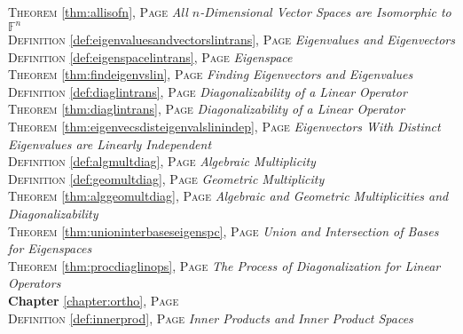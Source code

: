 \begin{multicols}{2}
{         \textsc{Theorem} \ref{thm:allisofn}, \textsc{Page} \pageref{thm:allisofn} \textit{All \(n\)-Dimensional Vector Spaces are Isomorphic to \(\mathbb {F}^n\)} \\
         \textsc{Definition} \ref{def:eigenvaluesandvectorslintrans}, \textsc{Page} \pageref{def:eigenvaluesandvectorslintrans} \textit{Eigenvalues and Eigenvectors} \\
         \textsc{Definition} \ref{def:eigenspacelintrans}, \textsc{Page} \pageref{def:eigenspacelintrans} \textit{Eigenspace} \\
         \textsc{Theorem} \ref{thm:findeigenvslin}, \textsc{Page} \pageref{thm:findeigenvslin} \textit{Finding Eigenvectors and Eigenvalues} \\
         \textsc{Definition} \ref{def:diaglintrans}, \textsc{Page} \pageref{def:diaglintrans} \textit{Diagonalizability of a Linear Operator} \\
         \textsc{Theorem} \ref{thm:diaglintrans}, \textsc{Page} \pageref{thm:diaglintrans} \textit{Diagonalizability of a Linear Operator} \\
         \textsc{Theorem} \ref{thm:eigenvecsdisteigenvalslinindep}, \textsc{Page} \pageref{thm:eigenvecsdisteigenvalslinindep} \textit{Eigenvectors With Distinct Eigenvalues are Linearly Independent} \\
         \textsc{Definition} \ref{def:algmultdiag}, \textsc{Page} \pageref{def:algmultdiag} \textit{Algebraic Multiplicity} \\
         \textsc{Definition} \ref{def:geomultdiag}, \textsc{Page} \pageref{def:geomultdiag} \textit{Geometric Multiplicity} \\
         \textsc{Theorem} \ref{thm:alggeomultdiag}, \textsc{Page} \pageref{thm:alggeomultdiag} \textit{Algebraic and Geometric Multiplicities and Diagonalizability} \\
         \textsc{Theorem} \ref{thm:unioninterbaseseigenspc}, \textsc{Page} \pageref{thm:unioninterbaseseigenspc} \textit{Union and Intersection of Bases for Eigenspaces} \\
         \textsc{Theorem} \ref{thm:procdiaglinops}, \textsc{Page} \pageref{thm:procdiaglinops} \textit{The Process of Diagonalization for Linear Operators} \\
         \textbf{Chapter} \ref{chapter:ortho}, \textsc{Page} \pageref{chapter:ortho} \\
         \textsc{Definition} \ref{def:innerprod}, \textsc{Page} \pageref{def:innerprod} \textit{Inner Products and Inner Product Spaces} \\
}
\end{multicols}
